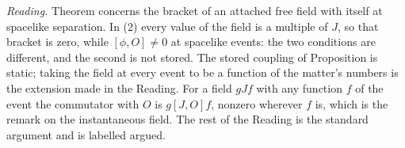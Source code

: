 \emph{Reading.} Theorem  concerns the bracket of an attached free field with itself at spacelike separation. In (2) every value of the field is a multiple of $J$, so that bracket is zero, while $[\phi, O] \neq 0$ at spacelike events: the two conditions are different, and the second is not stored. The stored coupling of Proposition  is static; taking the field at every event to be a function of the matter's numbers is the extension made in the Reading. For a field $gJf$ with any function $f$ of the event the commutator with $O$ is $g[J,O]f$, nonzero wherever $f$ is, which is the remark on the instantaneous field. The rest of the Reading is the standard argument and is labelled argued.

